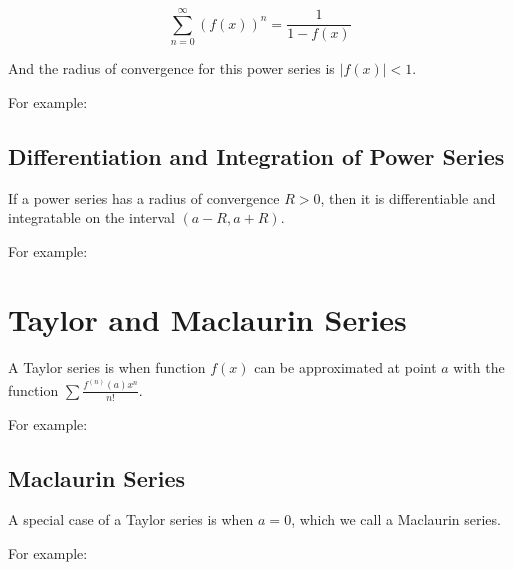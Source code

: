 \documentclass{article}
\begin{document}
\[
\sum_{n=0}^\infty (f(x))^n = \frac{1}{1-f(x)}
\]

And the radius of convergence for this power series is $\left| f(x) \right| < 1$.

For example:

\subsection{Differentiation and Integration of Power Series}

If a power series has a radius of convergence $R > 0$, then it is
differentiable and integratable on the interval $(a-R,a+R)$.

For example:

\section{Taylor and Maclaurin Series}

A Taylor series is when function $f(x)$ can be approximated at point
$a$ with the function $\sum \frac{f^{(n)}(a)x^n}{n!}$.

For example:

\subsection{Maclaurin Series}

A special case of a Taylor series is when $a=0$, which we call a Maclaurin series.

For example:
\end{document}
